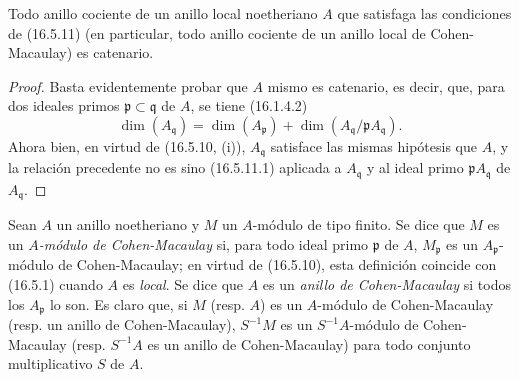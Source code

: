 \begin{corollary}[16.5.12]
\label{0.16.5.12-es}
Todo anillo cociente de un anillo local noetheriano $A$ que satisfaga las
condiciones de \textup{(16.5.11)} (en particular, todo anillo cociente de un anillo local
de Cohen-Macaulay) es catenario.
\end{corollary}

\begin{proof}
Basta evidentemente probar que $A$ mismo es catenario, es decir, que,
para dos ideales primos $\mathfrak{p}\subset\mathfrak{q}$ de $A$, se tiene
(16.1.4.2)
\[
  \dim(A_{\mathfrak{q}})
  =\dim(A_{\mathfrak{p}})
  +\dim(A_{\mathfrak{q}}/\mathfrak{p}A_{\mathfrak{q}}).
\]
Ahora bien, en virtud de (16.5.10, (i)), $A_{\mathfrak{q}}$ satisface las mismas
hipótesis que $A$, y la relación precedente no es sino
(16.5.11.1) aplicada a $A_{\mathfrak{q}}$ y al ideal primo
$\mathfrak{p}A_{\mathfrak{q}}$ de $A_{\mathfrak{q}}$.
\end{proof}

\begin{env}[16.5.13]
\label{0.16.5.13-es}
Sean $A$ un anillo noetheriano y $M$ un $A$-módulo de tipo finito. Se dice que
$M$ es un \emph{$A$-módulo de Cohen-Macaulay} si, para todo ideal primo
$\mathfrak{p}$ de $A$, $M_{\mathfrak{p}}$ es un $A_{\mathfrak{p}}$-módulo
de Cohen-Macaulay; en virtud de (16.5.10), esta definición coincide con
(16.5.1) cuando $A$ es \emph{local}. Se dice que $A$ es un
\emph{anillo de Cohen-Macaulay} si todos los $A_{\mathfrak{p}}$ lo son. Es
claro que, si $M$ (resp. $A$) es un $A$-módulo de Cohen-Macaulay (resp. un
anillo de Cohen-Macaulay), $S^{-1}M$ es un $S^{-1}A$-módulo de Cohen-Macaulay
(resp. $S^{-1}A$ es un anillo de Cohen-Macaulay) para todo conjunto
multiplicativo $S$ de $A$.
\end{env}
